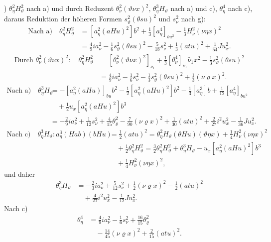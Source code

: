 \documentclass[11pt]{article}
\newcommand{\R}{\varrho}
\begin{document}
) $\theta_\eta^2H_\vartheta^2$ nach a) und durch Reduzent $\theta_\nu^2(\vartheta\nu x)^2$, $\theta_\eta^3H_\vartheta$ nach a) und c), $\theta_\eta^4$ nach c), daraus Reduktion der höheren Formen $s_\vartheta^2(\theta su)^2$ und $s_\nu^2$ nach g):
\[
\begin{aligned}
\text{Nach a)}\quad
\theta_\eta^2H_\vartheta^2&=[a_\eta^2(aHu)^2]b^2+\frac13[a_\eta^4]_{bu^2}-\frac13H_\nu^2(\nu\eta x)^2\\
&=\frac49ia_\nu^2-\frac16s_\vartheta^2(\theta su)^2-\frac5{18}s_\nu^2+\frac13(atu)^2+\frac1{54}Ju_x^2.
\end{aligned}
\]
\[
\begin{aligned}
\text{Durch }\theta_\nu^2(\vartheta\nu x)^2:
\quad\theta_\eta^2H_\vartheta^2
&=[\theta_\nu^2(\vartheta\nu x)^2]_{\nu_1}+\frac13[\theta_\nu^4]_{\nu_1}\hat\nu_1x^2-\frac13s_\vartheta^2(\theta su)^2\\
&=\frac49ia_\nu^2-\frac16s_\nu^2-\frac13s_\vartheta^2(\theta su)^2+\frac13(\nu\R x)^2.
\end{aligned}
\]
\[
\begin{aligned}
\text{Nach a)}\quad
\theta_\eta^3H_\vartheta&=-[a_\eta^2(aHu)]_{bu}b^2-\frac12[a_\eta^2(aHu)^2]b^2-\frac13[a_\eta^3]b+\frac1{12}[a_\eta^4]_{bu^2}\\
&\quad+\frac12u_x[a_\eta^2(aHu)^2]b^3\\
&=-\frac29ia_\nu^2+\frac1{12}s_\nu^2+\frac4{15}\theta_\R^2-\frac7{90}(\nu\R x)^2+\frac1{30}(atu)^2+\frac2{27}i^2u_x^2-\frac1{36}Ju_x^2.
\end{aligned}
\]
\[
\begin{aligned}
\text{Nach c)}\quad
\theta_\eta^3H_\vartheta:
 a_\eta^3(Hab)(bHu)&=\frac12(atu)^2
=\theta_\eta^2H_\vartheta(\theta Hu)(\vartheta\eta x)+\frac14H_\nu^2(\nu\eta x)^2\\
&\quad+\frac12\theta_\eta^2H_\vartheta^2
=\frac32\theta_\eta^2H_\vartheta^2+\theta_\eta^3H_\vartheta-u_x[a_\eta^2(aHu)^2]b^3\\
&\quad+\frac14H_\nu^2(\nu\eta x)^2,
\end{aligned}
\]
und daher
\[
\begin{aligned}
\theta_\eta^3H_\vartheta&=-\frac23ia_\nu^2+\frac5{12}s_\nu^2+\frac12(\nu\R x)^2-\frac12(atu)^2\\
&\quad+\frac4{27}i^2u_x^2-\frac1{12}Ju_x^2.
\end{aligned}
\]
Nach c)
\[
\begin{aligned}
\theta_\eta^4&=\frac49ia_\nu^2-\frac16s_\nu^2+\frac{16}{15}\theta_\R^2\\
&\quad-\frac{14}{45}(\nu\R x)^2+\frac2{15}(atu)^2.
\end{aligned}
\]
\end{document}
